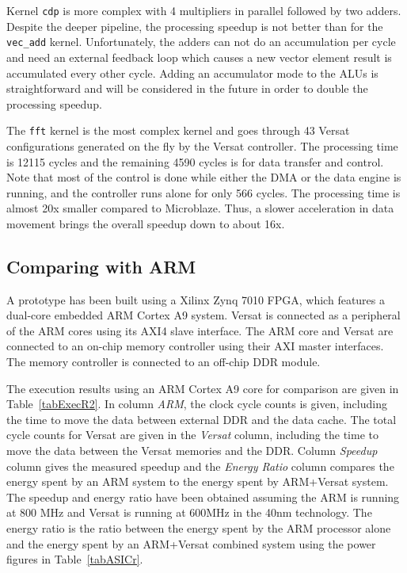 Kernel {\tt cdp} is more complex with 4 multipliers in parallel
followed by two adders. Despite the deeper pipeline, the processing
speedup is not better than for the {\tt vec\_add}
kernel. Unfortunately, the adders can not do an accumulation per cycle
and need an external feedback loop which causes a new vector element
result is accumulated every other cycle. Adding an accumulator mode to
the ALUs is straightforward and will be considered in the future in
order to double the processing speedup.

The {\tt fft} kernel is the most complex kernel and goes through 43
Versat configurations generated on the fly by the Versat
controller. The processing time is 12115 cycles and the remaining 4590
cycles is for data transfer and control. Note that most of the control
is done while either the DMA or the data engine is running, and the
controller runs alone for only 566 cycles. The processing time is
almost 20x smaller compared to Microblaze. Thus, a slower acceleration
in data movement brings the overall speedup down to about 16x.


\subsection{Comparing with ARM}

A prototype has been built using a Xilinx Zynq 7010 FPGA, which
features a dual-core embedded ARM Cortex A9 system. Versat is
connected as a peripheral of the ARM cores using its AXI4 slave
interface. The ARM core and Versat are connected to an on-chip memory
controller using their AXI master interfaces. The memory controller is
connected to an off-chip DDR module.

The execution results using an ARM Cortex A9 core for comparison are
given in Table~\ref{tabExecR2}. In column {\it ARM}, the clock cycle
counts is given, including the time to move the data between external
DDR and the data cache. The total cycle counts for Versat are given in
the {\it Versat} column, including the time to move the data between
the Versat memories and the DDR. Column {\it Speedup} column gives the
measured speedup and the {\it Energy Ratio} column compares the energy
spent by an ARM system to the energy spent by ARM+Versat system. The
speedup and energy ratio have been obtained assuming the ARM is
running at 800 MHz and Versat is running at 600MHz in the 40nm
technology. The energy ratio is the ratio between the energy spent by
the ARM processor alone and the energy spent by an ARM+Versat combined
system using the power figures in Table~\ref{tabASICr}.

